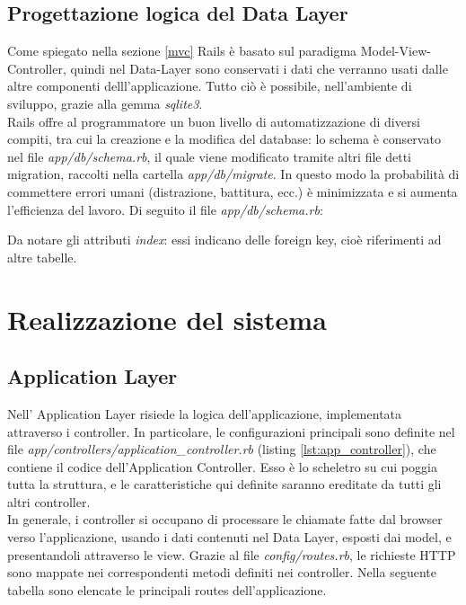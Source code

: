 \documentclass[Lau, binding=0.6cm, oneside]{sapthesis}
\begin{document}
\section{Progettazione logica del Data Layer}

Come spiegato nella sezione \ref{mvc} Rails è basato sul paradigma Model-View-Controller, quindi nel Data-Layer sono conservati i dati che verranno usati dalle altre componenti delll'applicazione. Tutto ciò è possibile, nell'ambiente di sviluppo, grazie alla gemma \textit{sqlite3}.\\
Rails offre al programmatore un buon livello di automatizzazione di diversi compiti, tra cui la creazione e la modifica del database: lo schema è conservato nel file \textit{app/db/schema.rb}, il quale viene modificato tramite altri file detti migration, raccolti nella cartella \textit{app/db/migrate}.
In questo modo la probabilità di commettere errori umani (distrazione, battitura, ecc.) è minimizzata e si aumenta l'efficienza del lavoro.
Di seguito il file \textit{app/db/schema.rb}:



Da notare gli attributi \textit{index}: essi indicano delle foreign key, cioè riferimenti ad altre tabelle.

\chapter{Realizzazione del sistema}

\section{Application Layer}

Nell' Application Layer risiede la logica dell'applicazione, implementata attraverso i controller. In particolare, le configurazioni principali sono definite nel file \textit{app/controllers/application\_controller.rb} (listing \ref{lst:app_controller}), che contiene il codice dell'Application Controller. Esso è lo scheletro su cui poggia tutta la struttura, e le caratteristiche qui definite saranno ereditate da tutti gli altri controller.\\
In generale, i controller si occupano di processare le chiamate fatte dal browser verso l'applicazione, usando i dati contenuti nel Data Layer, esposti dai model, e presentandoli attraverso le view. Grazie al file \textit{config/routes.rb}, le richieste HTTP sono mappate nei correspondenti metodi definiti nei controller. Nella seguente tabella sono elencate le principali routes dell'applicazione. 
\end{document}
